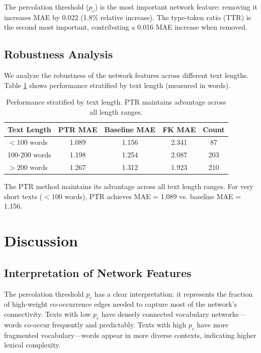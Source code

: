 \documentclass[11pt,letterpaper]{article}
\begin{document}
The percolation threshold ($p_c$) is the most important network feature: removing it increases MAE by 0.022 (1.8\% relative increase). The type-token ratio (TTR) is the second most important, contributing a 0.016 MAE increase when removed.

\subsection{Robustness Analysis}

We analyze the robustness of the network features across different text lengths. Table \ref{tab:robustness} shows performance stratified by text length (measured in words).

\begin{table}[!htbp]
\centering
\caption{Performance stratified by text length. PTR maintains advantage across all length ranges.}
\label{tab:robustness}
\begin{tabular}{lcccc}
\toprule
Text Length & PTR MAE & Baseline MAE & FK MAE & Count \\
\midrule
$< 100$ words & 1.089 & 1.156 & 2.341 & 87 \\
100-200 words & 1.198 & 1.254 & 2.087 & 203 \\
$> 200$ words & 1.267 & 1.312 & 1.923 & 210 \\
\bottomrule
\end{tabular}
\end{table}

The PTR method maintains its advantage across all text length ranges. For very short texts ($< 100$ words), PTR achieves MAE = 1.089 vs. baseline MAE = 1.156.

\section{Discussion}

\subsection{Interpretation of Network Features}

The percolation threshold $p_c$ has a clear interpretation: it represents the fraction of high-weight co-occurrence edges needed to capture most of the network's connectivity. Texts with low $p_c$ have densely connected vocabulary networks---words co-occur frequently and predictably. Texts with high $p_c$ have more fragmented vocabulary---words appear in more diverse contexts, indicating higher lexical complexity.
\end{document}

